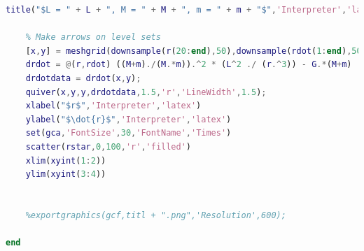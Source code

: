 \documentclass[11pt]{article}
\begin{document}
\begin{lstlisting}[language=Matlab]
    title("$L = " + L + ", M = " + M + ", m = " + m + "$",'Interpreter','latex')
    
    % Make arrows on level sets 
    [x,y] = meshgrid(downsample(r(20:end),50),downsample(rdot(1:end),50));
    drdot = @(r,rdot) ((M+m)./(M.*m)).^2 * (L^2 ./ (r.^3)) - G.*(M+m) ./ (r.^2);
    drdotdata = drdot(x,y);
    quiver(x,y,y,drdotdata,1.5,'r','LineWidth',1.5);
    xlabel("$r$",'Interpreter','latex')
    ylabel("$\dot{r}$",'Interpreter','latex')
    set(gca,'FontSize',30,'FontName','Times')
    scatter(rstar,0,100,'r','filled')
    xlim(xyint(1:2))
    ylim(xyint(3:4))
    

    %exportgraphics(gcf,titl + ".png",'Resolution',600);

end 
\end{lstlisting}
\end{document}
